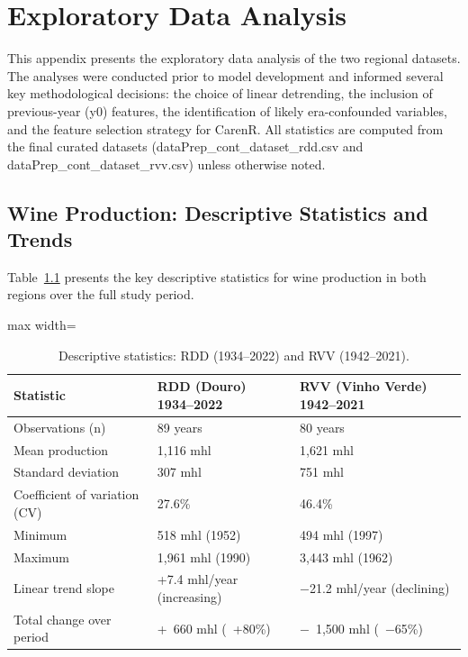
\chapter{Exploratory Data Analysis}\label{app:exploratory_data_analysis}

This appendix presents the exploratory data analysis of the two regional datasets. The analyses were conducted prior to model development and informed several key methodological decisions: the choice of linear detrending, the inclusion of previous-year (y0) features, the identification of likely era-confounded variables, and the feature selection strategy for CarenR. All statistics are computed from the final curated datasets (dataPrep\_cont\_dataset\_rdd.csv and dataPrep\_cont\_dataset\_rvv.csv) unless otherwise noted.


\section{Wine Production: Descriptive Statistics and Trends}\label{app_sec:wine_production_descriptive_statistics}

Table~\ref{tab:appb_1} presents the key descriptive statistics for wine production in both regions over the full study period.

\begin{table}[htbp]
  \centering
  \caption{Descriptive statistics: RDD (1934--2022) and RVV (1942--2021).}\label{tab:appb_1}
  \footnotesize
  \begin{adjustbox}{max width=\textwidth}
    \begin{tabularx}{\textwidth}{l|l|X}
  \toprule
  Statistic & RDD (Douro)
1934--2022 & RVV (Vinho Verde)
1942--2021 \\
  \midrule
  Observations (n) & 89 years & 80 years \\
  Mean production & 1,116 mhl & 1,621 mhl \\
  Standard deviation & 307 mhl & 751 mhl \\
  Coefficient of variation (CV) & 27.6\% & 46.4\% \\
  Minimum & 518 mhl (1952) & 494 mhl (1997) \\
  Maximum & 1,961 mhl (1990) & 3,443 mhl (1962) \\
  Linear trend slope & +7.4 mhl/year (increasing) & $-$21.2 mhl/year (declining) \\
  Total change over period & +~660 mhl (~+80\%) & $-$~1,500 mhl (~$-$65\%) \\
  \bottomrule
  \end{tabularx}
  \end{adjustbox}

\end{table}


